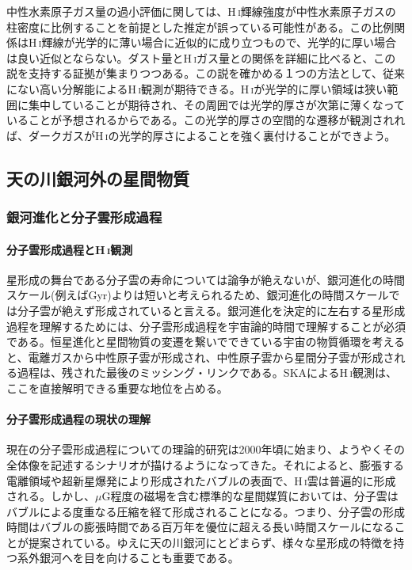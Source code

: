中性水素原子ガス量の過小評価に関しては、H\,\textsc{i}輝線強度が中性水素原子ガスの柱密度に比例することを前提とした推定が誤っている可能性がある。この比例関係はH\,\textsc{i}輝線が光学的に薄い場合に近似的に成り立つもので、光学的に厚い場合は良い近似とならない。ダスト量とH\,\textsc{i}ガス量との関係を詳細に比べると、この説を支持する証拠が集まりつつある\citep{2014ApJ...796...59F,2015ApJ...798....6F}。この説を確かめる１つの方法として、従来にない高い分解能によるH\,\textsc{i}観測が期待できる。H\,\textsc{i}が光学的に厚い領域は狭い範囲に集中していることが期待され、その周囲では光学的厚さが次第に薄くなっていることが予想されるからである。この光学的厚さの空間的な遷移が観測されれば、ダークガスがH\,\textsc{i}の光学的厚さによることを強く裏付けることができよう。


\subsection{天の川銀河外の星間物質}
\label{c08.s1.ss3}

\subsubsection{銀河進化と分子雲形成過程}
\label{c08.s1.ss3.sss1}

\paragraph{分子雲形成過程とH\,\textsc{i}観測}

星形成の舞台である分子雲の寿命については論争が絶えないが、銀河進化の時間スケール(例えばGyr)よりは短いと考えられるため、銀河進化の時間スケールでは分子雲が絶えず形成されていると言える。銀河進化を決定的に左右する星形成過程を理解するためには、分子雲形成過程を宇宙論的時間で理解することが必須である。恒星進化と星間物質の変遷を繋いでできている宇宙の物質循環を考えると、電離ガスから中性原子雲が形成され、中性原子雲から星間分子雲が形成される過程は、残された最後のミッシング・リンクである。SKAによるH\,\textsc{i}観測は、ここを直接解明できる重要な地位を占める。

\paragraph{分子雲形成過程の現状の理解}

現在の分子雲形成過程についての理論的研究は2000年頃に始まり\citep{1999A&A...351..309H, 2000ApJ...532..980K}、ようやくその全体像を記述するシナリオが描けるようになってきた。それによると、膨張する電離領域や超新星爆発により形成されたバブルの表面で、H\,\textsc{i}雲は普遍的に形成される。しかし、$\mu$G程度の磁場を含む標準的な星間媒質においては、分子雲はバブルによる度重なる圧縮を経て形成されることになる\citep{2008ApJ...687..303I, 2009ApJ...704..161I, 2012ApJ...759...35I}。つまり、分子雲の形成時間はバブルの膨張時間である百万年を優位に超える長い時間スケールになることが提案されている\citep{2013ASPC..476..369I}。ゆえに天の川銀河にとどまらず、様々な星形成の特徴を持つ系外銀河へを目を向けることも重要である。


